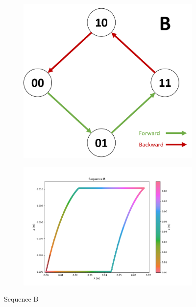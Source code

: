         \begin{figure}[h]
            \begin{subfigure}{.3\textwidth}
            \includegraphics[width=\textwidth]{images/S_B.png}
            \end{subfigure}%
            \begin{subfigure}{.7\textwidth}
            \includegraphics[width=\textwidth]{images/B.png}
            \end{subfigure}
            \caption{Sequence B}
        \end{figure}
